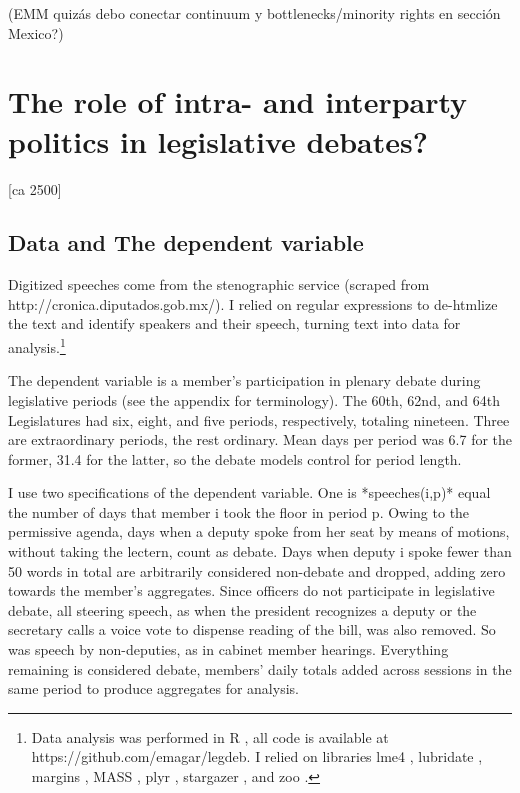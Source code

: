 \documentclass[letter,12pt]{article}
\begin{document}
(EMM quizás debo conectar continuum y bottlenecks/minority rights en sección Mexico?)

\section{The role of intra- and interparty politics in legislative debates?} [ca 2500]
 

  \subsection{Data and The dependent variable}

Digitized speeches come from the stenographic service (scraped from http://cronica.diputados.gob.mx/). I relied on regular expressions to de-htmlize the text and identify speakers and their speech, turning text into data for analysis.\footnote{Data analysis was performed in R \citep{r.cite}, all code is available at https://github.com/emagar/legdeb. I relied on libraries lme4 \citep{r.lme4}, lubridate \citep{r.lubridate}, margins \citep{r.margins}, MASS \citep{r.mass}, plyr \citep{r.plyr}, stargazer \citep{r.stargazer}, and zoo \citep{r.zoo}.}

The dependent variable is a member's participation in plenary debate during legislative periods (see the appendix for terminology). The 60th, 62nd, and 64th Legislatures had six, eight, and five periods, respectively, totaling nineteen. Three are extraordinary periods, the rest ordinary. Mean days per period was 6.7 for the former, 31.4 for the latter, so the debate models control for period length. 

I use two specifications of the dependent variable. One is *speeches(i,p)* equal the number of days that member i took the floor in period p. Owing to the permissive agenda, days when a deputy spoke from her seat by means of motions, without taking the lectern, count as debate. Days when deputy i spoke fewer than 50 words in total are arbitrarily considered non-debate and dropped, adding zero towards the member's aggregates. Since officers do not participate in legislative debate, all steering speech, as when the president recognizes a deputy or the secretary calls a voice vote to dispense reading of the bill, was also removed. So was speech by non-deputies, as in cabinet member hearings. Everything remaining is considered debate, members' daily totals added across sessions in the same period to produce aggregates for analysis.
\end{document}

